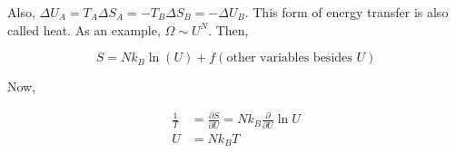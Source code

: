 \documentclass{article}
\newtheorem{one minute paper}[theorem]{One Minute Paper}
\begin{document}
Also, $\Delta U_A = T_A \Delta S_A = -T_B \Delta S_B = -\Delta U_B$. This form of energy transfer is also called heat. As an example, $\Omega \sim U^N$. Then, 

\begin{equation}
    S = Nk_B \ln (U) + f(\text{other variables besides $U$})
\end{equation}

Now, 

\begin{align}
    \frac{1}{T} &= \frac{\partial S}{\partial U} = Nk_B \frac{\partial}{\partial U} \ln U \\
    U &= Nk_B T 
\end{align}
\end{document}
